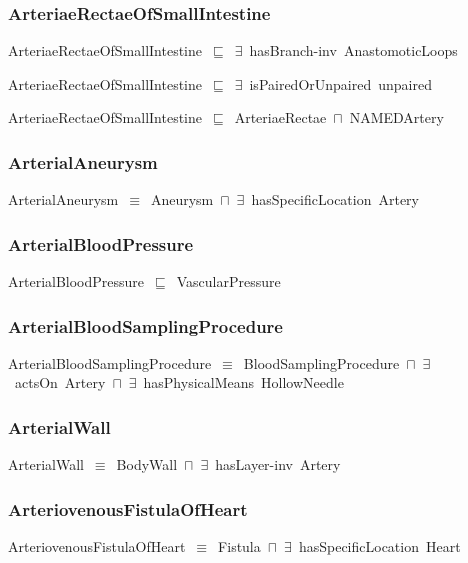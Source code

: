 \documentclass{article}
\begin{document}
\subsubsection*{ArteriaeRectaeOfSmallIntestine}

ArteriaeRectaeOfSmallIntestine~\ensuremath{\sqsubseteq}~\ensuremath{\exists}~hasBranch-inv~AnastomoticLoops~

ArteriaeRectaeOfSmallIntestine~\ensuremath{\sqsubseteq}~\ensuremath{\exists}~isPairedOrUnpaired~unpaired~

ArteriaeRectaeOfSmallIntestine~\ensuremath{\sqsubseteq}~ArteriaeRectae~\ensuremath{\sqcap}~NAMEDArtery~

\subsubsection*{ArterialAneurysm}

ArterialAneurysm~\ensuremath{\equiv}~Aneurysm~\ensuremath{\sqcap}~\ensuremath{\exists}~hasSpecificLocation~Artery

\subsubsection*{ArterialBloodPressure}

ArterialBloodPressure~\ensuremath{\sqsubseteq}~VascularPressure~

\subsubsection*{ArterialBloodSamplingProcedure}

ArterialBloodSamplingProcedure~\ensuremath{\equiv}~BloodSamplingProcedure~\ensuremath{\sqcap}~\ensuremath{\exists}~actsOn~Artery~\ensuremath{\sqcap}~\ensuremath{\exists}~hasPhysicalMeans~HollowNeedle

\subsubsection*{ArterialWall}

ArterialWall~\ensuremath{\equiv}~BodyWall~\ensuremath{\sqcap}~\ensuremath{\exists}~hasLayer-inv~Artery

\subsubsection*{ArteriovenousFistulaOfHeart}

ArteriovenousFistulaOfHeart~\ensuremath{\equiv}~Fistula~\ensuremath{\sqcap}~\ensuremath{\exists}~hasSpecificLocation~Heart
\end{document}
